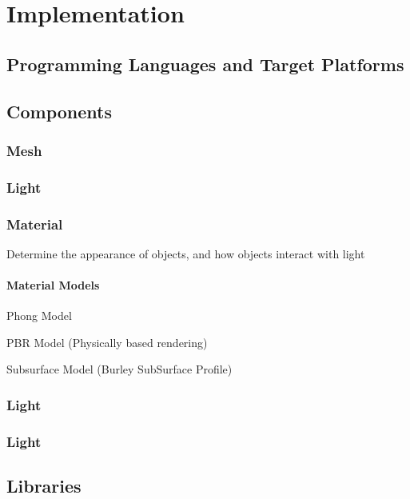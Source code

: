 \chapter{Implementation}
\label{cha:Implementation}

\section{Programming Languages and Target Platforms}

\section{Components}

\subsection{Mesh}
\subsection{Light}
\subsection{Material}
Determine the appearance of objects, and how objects interact with light

\subsubsection{Material Models}

Phong Model

PBR Model (Physically based rendering)

Subsurface Model (Burley SubSurface Profile)


\subsection{Light}
\subsection{Light}

\section{Libraries}